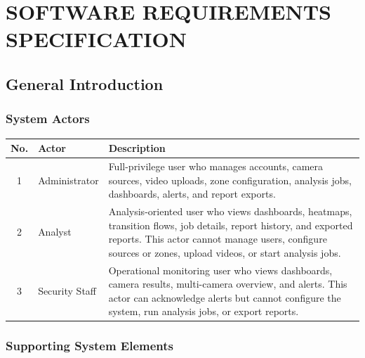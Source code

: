 \documentclass[12pt,a4paper]{report}
\begin{document}
\chapter{SOFTWARE REQUIREMENTS SPECIFICATION}

\section{General Introduction}

\subsection{System Actors}

\begin{longtable}{|c|p{3.6cm}|p{9.3cm}|}
\hline
\rowcolor{HeaderBlue}
\textbf{No.} & \textbf{Actor} & \textbf{Description} \\
\hline

1 & Administrator & Full-privilege user who manages accounts, camera sources, video uploads, zone configuration, analysis jobs, dashboards, alerts, and report exports. \\
\hline

2 & Analyst & Analysis-oriented user who views dashboards, heatmaps, transition flows, job details, report history, and exported reports. This actor cannot manage users, configure sources or zones, upload videos, or start analysis jobs. \\
\hline

3 & Security Staff & Operational monitoring user who views dashboards, camera results, multi-camera overview, and alerts. This actor can acknowledge alerts but cannot configure the system, run analysis jobs, or export reports. \\
\hline

\end{longtable}

\subsection{Supporting System Elements}
\end{document}
